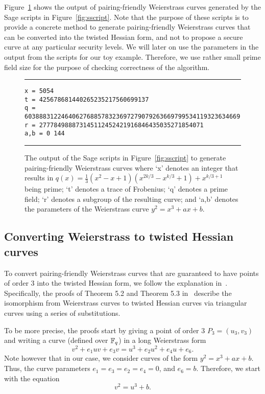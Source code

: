 Figure~\ref{fig:sout} shows the output of
pairing-friendly Weierstrass curves generated by the Sage scripts in Figure~\ref{fig:sscript}.
Note that the purpose of these scripts is to provide a concrete method to generate
pairing-friendly Weierstrass curves that can be converted into the twisted Hessian form,
and not to propose a secure curve at any particular security levels.
We will later on use the parameters in the output from the scripts for our toy example.
Therefore, we use rather small prime field size for the purpose of checking correctness of the algorithm.

\begin{figure}
\hrule\medskip
{\scriptsize
\begin{verbatim}
x = 5054
t = 425678681440265235217560699137
q = 60388831224640627688578323697279079263669799534119323634669
r = 277784988873145112452421916846435035271854071
a,b = 0 144
\end{verbatim}
}
\hrule
\caption{The output of the Sage scripts in Figure~\ref{fig:sscript}
to generate pairing-friendly Weierstrass curves where
`x' denotes an integer that results in $q(x) = \frac{1}{3} (x^2 - x + 1) (x^{2k/3} - x^{k/3} + 1) + x^{k/3+1}$ being prime;
`t' denotes a trace of Frobenius;
`q' denotes a prime field;
`r' denotes a subgroup of the resulting curve; and
`a,b' denotes the parameters of the Weierstrass curve $y^2 = x^3 + ax + b$.
}
\label{fig:sout}
\end{figure}



\subsection{Converting Weierstrass to twisted Hessian curves}
\label{subsec:w2h}

To convert pairing-friendly Weierstrass curves that are guaranteed to have points of order 3
into the twisted Hessian form, we follow the explanation in~\cite{2015/hessian}.
Specifically, the proofs of Theorem 5.2 and {Theorem 5.3} in~\cite{2015/hessian} describe the isomorphism from
Weierstrass curves to twisted Hessian curves via triangular curves using a series of substitutions.

To be more precise, the proofs start by giving a point of order 3 $P_3 = (u_3,v_3)$ and
writing a curve (defined over $\mathbb{F}_{q}$) in a long Weierstrass form
$$ v^2 + e_1 uv + e_3 v = u^3 + e_2 u^2 + e_4 u + e_6. $$
Note however that in our case, we consider curves of the form $y^2 = x^3 + ax + b$.
Thus, the curve parameters $e_1 = e_3 = e_2 = e_4 = 0$, and $e_6 = b$.
Therefore, we start with the equation
$$v^2 = u^3 + b.$$

